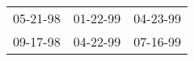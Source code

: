 \begin{supertabular}{lll}
 05-21-98\textsuperscript{} &  01-22-99\textsuperscript{} &  04-23-99\textsuperscript{} \\
 09-17-98\textsuperscript{} &  04-22-99\textsuperscript{} &  07-16-99\textsuperscript{} \\
\end{supertabular}
